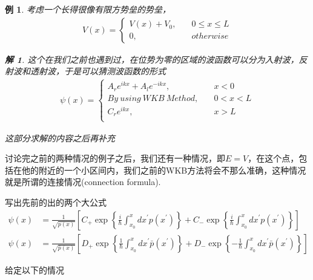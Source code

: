 \documentclass{article}
\newtheorem{example}{例}
\newtheorem{solution}{解}
\begin{document}
\begin{example}
    考虑一个长得很像有限方势垒的势垒，
    \begin{align*}
        V(x)=
        \begin{cases}
            V(x)+V_0,&\quad 0\leq x\leq L\\
            0,&\quad otherwise
        \end{cases}
    \end{align*}
    \begin{solution}
        这个在我们之前也遇到过，在位势为零的区域的波函数可以分为入射波，反射波和透射波，于是可以猜测波函数的形式
        \begin{align*}
            \psi(x)=
            \begin{cases}
                A_re^{ikx}+A_le^{-ikx},&\quad x<0\\
                By\ using\ WKB\ Method,&\quad 0<x<L\\
                C_re^{ikx},&\quad x>L\\
            \end{cases}
        \end{align*}

        这部分求解的内容之后再补充
    \end{solution}
\end{example}


讨论完之前的两种情况的例子之后，我们还有一种情况，即$E=V$，在这个点，包括在他的附近的一个小区间内，我们之前的WKB方法将会不那么准确，这种情况就是所谓的连接情况(connection formula).

写出先前的出的两个大公式
\begin{align*}
    \psi(x)&=\frac{1}{\sqrt{p(x)}}\left[C_+\exp\left\{\frac{i}{\hbar}\int_{x_0}^{x}dx^\prime p(x^\prime)\right\}+C_-\exp\left\{\frac{i}{\hbar}\int_{x_0}^{x}dx^\prime p(x^\prime)\right\}\right]\\
    \psi(x)&=\frac{1}{\sqrt{\bar{p}(x)}}\left[D_+\exp\left\{\frac{1}{\hbar}\int_{x_0}^{x}dx^\prime\bar{p}(x^\prime)\right\}+D_-\exp\left\{-\frac{1}{\hbar}\int_{x_0}^{x}dx^\prime\bar{p}(x^\prime)\right\}\right]
\end{align*}

给定以下的情况
\begin{center}
\end{center}
\end{document}
